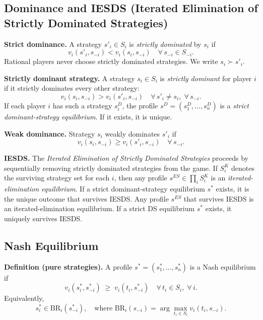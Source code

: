 \documentclass[11pt]{article}
\newcommand{\BR}{\mathrm{BR}}
\begin{document}
\begin{multicols}{2}
\subsection*{Dominance and IESDS (Iterated Elimination of Strictly Dominated Strategies)}

\textbf{Strict dominance.}  
A strategy $s'_i \in S_i$ is \emph{strictly dominated} by $s_i$ if
\[
v_i(s'_i,s_{-i}) < v_i(s_i,s_{-i}) \quad \forall\, s_{-i}\in S_{-i}.
\]
Rational players never choose strictly dominated strategies. We write $s_i \succ s'_i$.

\textbf{Strictly dominant strategy.}  
A strategy $s_i \in S_i$ is \emph{strictly dominant} for player $i$ if it strictly dominates every other strategy:
\[
v_i(s_i,s_{-i}) > v_i(s'_i,s_{-i}) \quad \forall\, s'_i \neq s_i,\;\forall\, s_{-i}.
\]
If each player $i$ has such a strategy $s_i^D$, the profile $s^D=(s_1^D,\dots,s_n^D)$ is a \emph{strict dominant-strategy equilibrium}.  
If it exists, it is unique.

\textbf{Weak dominance.}  
Strategy $s_i$ weakly dominates $s'_i$ if
\[
v_i(s_i,s_{-i}) \geq v_i(s'_i,s_{-i}) \quad \forall\, s_{-i}.
\]

\textbf{IESDS.}  
The \emph{Iterated Elimination of Strictly Dominated Strategies} proceeds by sequentially removing strictly dominated strategies from the game.  
If $S_i^K$ denotes the surviving strategy set for each $i$, then any profile $s^{ES} \in \prod_i S_i^K$ is an \emph{iterated-elimination equilibrium}.  
If a strict dominant-strategy equilibrium $s^*$ exists, it is the unique outcome that survives IESDS. Any profile $s^{ES}$ that survives IESDS is an iterated-elimination equilibrium. If a strict DS equilibrium $s^*$ exists, it uniquely survives IESDS.



\subsection*{Nash Equilibrium}

\textbf{Definition (pure strategies).}  
A profile $s^*=(s_1^*,\dots,s_n^*)$ is a Nash equilibrium if
\[
v_i(s_i^*,s_{-i}^*) \;\ge\; v_i(t_i,s_{-i}^*) \quad \forall\, t_i \in S_i,\;\forall\, i.
\]
Equivalently,
\[
s_i^* \in \BR_i(s_{-i}^*), 
\quad \text{where } \BR_i(s_{-i})=\arg\max_{t_i \in S_i} v_i(t_i,s_{-i}).
\]


\end{multicols}
\end{document}
